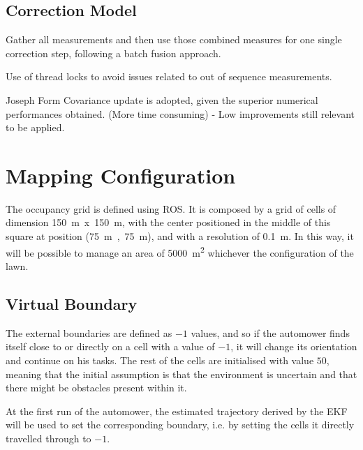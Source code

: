 \subsection{Correction Model}

\noindent
Gather all measurements and then use those combined measures for one single correction step, following a batch fusion approach.

Use of thread locks to avoid issues related to out of sequence measurements.

Joseph Form Covariance update is adopted, given the superior numerical performances obtained.
(More time consuming) - Low improvements still relevant to be applied.



\section{Mapping Configuration}
\label{sec:mapConf}

\noindent The occupancy grid is defined using \gls{ROS}. It is composed by a grid of cells of dimension \SI{150}{m}~x~\SI{150}{m}, with the center positioned in the middle of this square at position (\SI{75}{m}~,~\SI{75}{m}), and with a resolution of \SI{0.1}{m}. In this way, it will be possible to manage an area of \SI{5000}{m^2} whichever the configuration of the lawn.

\subsection{Virtual Boundary}
\noindent
The external boundaries are defined as $-1$ values, and so if the automower finds itself close to or directly on a cell with a value of $-1$, it will change its orientation and continue on his tasks.
The rest of the cells are initialised with value $50$, meaning that the initial assumption is that the environment is uncertain and that there might be obstacles present within it.

At the first run of the automower, the estimated trajectory derived by the EKF will be used to set the corresponding boundary, i.e. by setting the cells it directly travelled through to $-1$.

